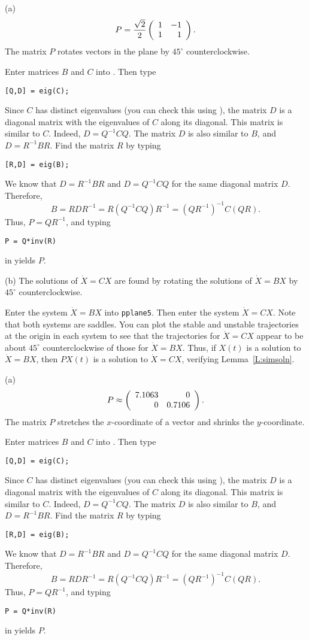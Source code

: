 (a) \ans
\[
P = \frac{\sqrt{2}}{2}\left(\begin{array}{rr} 1 & -1\\ 1 &1\end{array}\right).
\]
The matrix $P$ rotates vectors in the plane by $45^\circ$ counterclockwise.

\soln Enter matrices $B$ and $C$ into \Matlabp.  Then type
\begin{verbatim}
[Q,D] = eig(C);
\end{verbatim}
Since $C$ has distinct eigenvalues (you can check this using
\Matlabp), the matrix $D$ is a diagonal matrix with the eigenvalues of
$C$ along its diagonal.  This matrix is similar to $C$.  Indeed, $D =
Q^{-1}CQ$.  The matrix $D$ is also similar to $B$, and $D= R^{-1}BR$.
Find the matrix $R$ by typing
\begin{verbatim}
[R,D] = eig(B);
\end{verbatim}
We know that $D = R^{-1}BR$ and $D = Q^{-1}CQ$ for the same diagonal
matrix $D$.  Therefore,
\[
B = RDR^{-1} = R(Q^{-1}CQ)R^{-1} = (QR^{-1})^{-1}C(QR).
\]
Thus, $P = QR^{-1}$, and typing
\begin{verbatim}
P = Q*inv(R)
\end{verbatim}
in \Matlab yields $P$.

(b) \ans The solutions of $\dot{X} = CX$ are found by rotating the
solutions of $\dot{X} = BX$ by $45^\circ$ counterclockwise.

\soln Enter the system $\dot{X} = BX$ into {\tt pplane5}.  Then enter the
system $\dot{X} = CX$.  Note that both systems are saddles.  You can
plot the stable and unstable trajectories at the origin in each system
to see that the trajectories for $\dot{X} = CX$ appear to be about
$45^\circ$ counterclockwise of those for $\dot{X} = BX$.  Thus, if
$X(t)$ is a solution to $\dot{X} = BX$, then $PX(t)$ is a solution to
$\dot{X} = CX$, verifying Lemma~\ref{L:simsoln}.

(a) \ans
\[
P \approx \left(\begin{array}{rr} 7.1063 & 0\\ 0 &0.7106\end{array}\right).
\]
The matrix $P$ stretches the $x$-coordinate of a vector and shrinks the
$y$-coordinate.

\soln Enter matrices $B$ and $C$ into \Matlabp.  Then type
\begin{verbatim}
[Q,D] = eig(C);
\end{verbatim}
Since $C$ has distinct eigenvalues (you can check this using
\Matlabp), the matrix $D$ is a diagonal matrix with the eigenvalues of
$C$ along its diagonal.  This matrix is similar to $C$.  Indeed, $D =
Q^{-1}CQ$.  The matrix $D$ is also similar to $B$, and $D= R^{-1}BR$.
Find the matrix $R$ by typing
\begin{verbatim}
[R,D] = eig(B);
\end{verbatim}
We know that $D = R^{-1}BR$ and $D = Q^{-1}CQ$ for the same diagonal
matrix $D$.  Therefore,
\[
B = RDR^{-1} = R(Q^{-1}CQ)R^{-1} = (QR^{-1})^{-1}C(QR).
\]
Thus, $P = QR^{-1}$, and typing
\begin{verbatim}
P = Q*inv(R)
\end{verbatim}
in \Matlab yields $P$.

